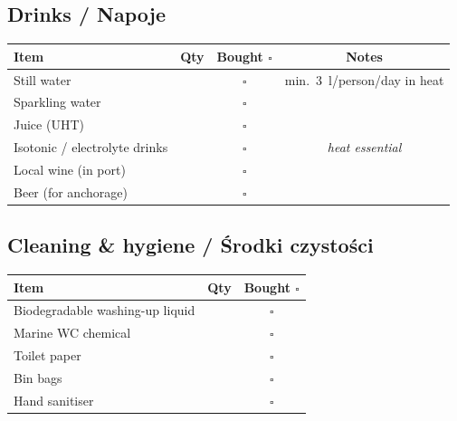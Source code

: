 \documentclass[a4paper,11pt]{article}
\begin{document}
\vspace{0.3cm}

\subsection*{Drinks / Napoje}
\begin{tabularx}{\linewidth}{|X|c|c|c|}
\hline
\textbf{Item} & \textbf{Qty} & \textbf{Bought \(\square\)} & \textbf{Notes} \\
\hline
Still water & & \(\square\) & min.\ 3~l/person/day in heat \\[4pt]\hline
Sparkling water & & \(\square\) & \\[4pt]\hline
Juice (UHT) & & \(\square\) & \\[4pt]\hline
Isotonic / electrolyte drinks & & \(\square\) & \textit{heat essential} \\[4pt]\hline
Local wine (in port) & & \(\square\) & \\[4pt]\hline
Beer (for anchorage) & & \(\square\) & \\[4pt]\hline
\end{tabularx}

\vspace{0.3cm}

\subsection*{Cleaning \& hygiene / Środki czystości}
\begin{tabularx}{\linewidth}{|X|c|c|}
\hline
\textbf{Item} & \textbf{Qty} & \textbf{Bought \(\square\)} \\
\hline
Biodegradable washing-up liquid & & \(\square\) \\[4pt]\hline
Marine WC chemical & & \(\square\) \\[4pt]\hline
Toilet paper & & \(\square\) \\[4pt]\hline
Bin bags & & \(\square\) \\[4pt]\hline
Hand sanitiser & & \(\square\) \\[4pt]\hline
\end{tabularx}

\vspace{0.3cm}
\end{document}
